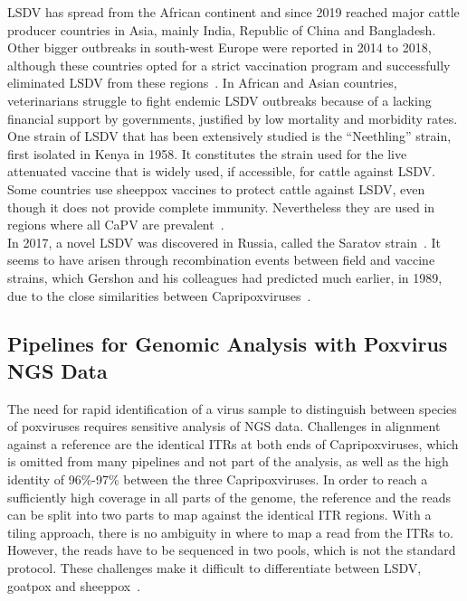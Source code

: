 \ac{LSDV} has spread from the African continent and since 2019 reached major cattle producer countries in Asia, mainly India, Republic of China and Bangladesh. Other bigger outbreaks in south-west Europe were reported in 2014 to 2018, although these countries opted for a strict vaccination program and successfully eliminated \ac{LSDV} from these regions~\cite{prevention2017control}. In African and Asian countries, veterinarians struggle to fight endemic \ac{LSDV} outbreaks because of a lacking financial support by governments, justified by low mortality and morbidity rates. \\
One strain of \ac{LSDV} that has been extensively studied is the ``Neethling'' strain, first isolated in Kenya in 1958. It constitutes the strain used for the live attenuated vaccine that is widely used, if accessible, for cattle against \ac{LSDV}. Some countries use sheeppox vaccines to protect cattle against \ac{LSDV}, even though it does not provide complete immunity. Nevertheless they are used in regions where all \acs{CaPV} are prevalent~\cite{brenner2009appearance}. \\
In 2017, a novel \ac{LSDV} was discovered in Russia, called the Saratov strain~\cite{sprygin2018analysis}. It seems to have arisen through recombination events between field and vaccine strains, which Gershon and his colleagues had predicted much earlier, in 1989, due to the close similarities between Capripoxviruses~\cite{gershon1989poxvirus}. 

\subsection{Pipelines for Genomic Analysis with Poxvirus NGS Data}\label{sec:2-pox-pipelines}
The need for rapid identification of a virus sample to distinguish between species of poxviruses requires sensitive analysis of \ac{NGS} data. Challenges in alignment against a reference are the identical \acp{ITR} at both ends of Capripoxviruses, which is omitted from many pipelines and not part of the analysis, as well as the high identity of 96\%-97\% between the three Capripoxviruses. In order to reach a sufficiently high coverage in all parts of the genome, the reference and the reads can be split into two parts to map against the identical \ac{ITR} regions. With a tiling approach, there is no ambiguity in where to map a read from the \acp{ITR} to. However, the reads have to be sequenced in two pools, which is not the standard protocol. These challenges make it difficult to differentiate between \ac{LSDV}, goatpox and sheeppox~\cite{tulman2001genome}.

